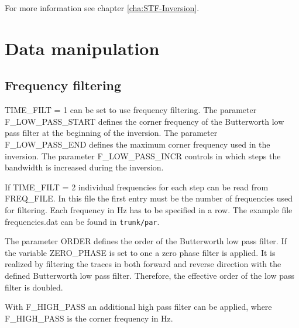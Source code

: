 For more information see chapter \ref{cha:STF-Inversion}.


\section{Data manipulation}
\subsection{Frequency filtering}
\label{sec:filtering}
{\color{blue}{\begin{verbatim}
"Frequency filtering during inversion" : "comment",
			"TIME_FILT" : "0",
			"F_HIGH_PASS" : "1",
			"F_LOW_PASS_START" : "10.0",
			"F_LOW_PASS_END" : "75.0",
			"F_LOW_PASS_INCR" : "10.0",
			"ORDER" : "2",
			"ZERO_PHASE" : "0",
			"FREQ_FILE"  : "frequencies.dat",
			"WRITE_FILTERED_DATA" : "0",
			
			"Minimum number of iteration per frequency" : "comment",
			"MIN_ITER" : "10",
\end{verbatim}}}

{\color{red}{\begin{verbatim}
Default values are:
	TIME_FILT=0
	ZERO_PHASE=0
	MIN_ITER=0
\end{verbatim}}}

TIME\_FILT = 1 can be set to use frequency filtering. The parameter F\_LOW\_PASS\_START defines the corner frequency of the Butterworth low pass filter at the beginning of the inversion. The parameter F\_LOW\_PASS\_END defines the maximum corner frequency used in the inversion. The parameter F\_LOW\_PASS\_INCR controls in which steps the bandwidth is increased during the inversion.

If TIME\_FILT = 2 individual frequencies for each step can be read from FREQ\_FILE. In this file the first entry must be the number of frequencies used for filtering. Each frequency in Hz has to be specified in a row. The example file frequencies.dat can be found in \texttt{trunk/par}.

The parameter ORDER defines the order of the Butterworth low pass filter. If the variable ZERO\_PHASE is set to one a zero phase filter is applied. It is realized by filtering the traces in both forward and reverse direction with the defined Butterworth low pass filter. Therefore, the effective order of the low pass filter is doubled. 

With F\_HIGH\_PASS an additional high pass filter can be applied, where F\_HIGH\_PASS is the corner frequency in Hz.

